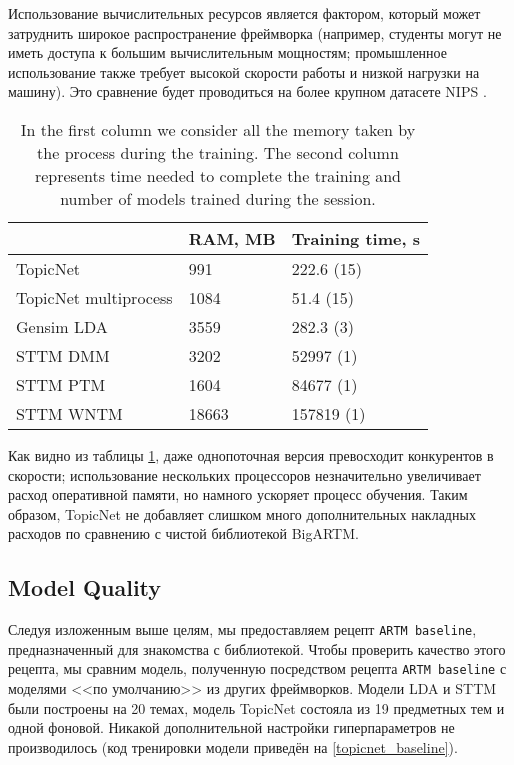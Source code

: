 Использование вычислительных ресурсов является фактором, который может затруднить широкое распространение фреймворка (например, студенты могут не иметь доступа к большим вычислительным мощностям; промышленное  использование также требует высокой скорости работы и низкой нагрузки на машину). Это сравнение будет проводиться на более крупном датасете NIPS \cite{mccallum1996bow}.  

\begin{table}[h]
\begin{tabular}{|l|l|l|}
\hline
                      & \multicolumn{1}{c|}{RAM, MB} & \multicolumn{1}{c|}{Training time, s} \\ \hline
TopicNet              & 991                         & 222.6 (15)                             \\ \hline
TopicNet multiprocess & 1084                        & 51.4 (15)                              \\ \hline
Gensim LDA            & 3559                        & 282.3 (3)                              \\ \hline
STTM DMM              & 3202                        & 52997 (1)                              \\ \hline
STTM PTM              & 1604                        & 84677 (1)                              \\ \hline
STTM WNTM             & 18663                       & 157819 (1)                             \\ \hline
\end{tabular}
\caption{In the first column we consider all the memory taken by the process during the training. The second column represents time needed to complete the training and number of models trained during the session.}
\label{performance-benchmark}
\end{table} 

Как видно из таблицы \ref{performance-benchmark}, даже однопоточная версия превосходит конкурентов в скорости; использование нескольких процессоров незначительно увеличивает расход оперативной памяти, но намного ускоряет процесс обучения. Таким образом, TopicNet не добавляет слишком много дополнительных накладных расходов по сравнению с чистой библиотекой BigARTM.  

\subsection{Model Quality} 

Следуя изложенным выше целям, мы предоставляем рецепт \texttt{ARTM baseline}, предназначенный для знакомства с библиотекой. Чтобы проверить качество этого рецепта, мы сравним модель, полученную посредством рецепта \texttt{ARTM baseline} с моделями <<по умолчанию>> из других фреймворков. Модели LDA и STTM были построены на 20 темах, модель TopicNet состояла из 19 предметных тем и одной фоновой. Никакой дополнительной настройки гиперпараметров не производилось (код тренировки модели приведён на \ref{topicnet_baseline}).  

